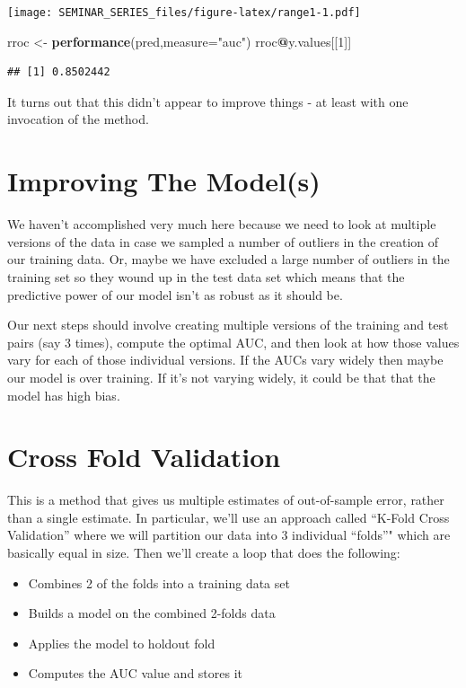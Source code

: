 \documentclass[]{book}
\newenvironment{Shaded}{\begin{snugshade}}{\end{snugshade}}
\newcommand{\KeywordTok}[1]{\textcolor[rgb]{0.13,0.29,0.53}{\textbf{#1}}}
\newcommand{\DataTypeTok}[1]{\textcolor[rgb]{0.13,0.29,0.53}{#1}}
\newcommand{\DecValTok}[1]{\textcolor[rgb]{0.00,0.00,0.81}{#1}}
\newcommand{\StringTok}[1]{\textcolor[rgb]{0.31,0.60,0.02}{#1}}
\newcommand{\OperatorTok}[1]{\textcolor[rgb]{0.81,0.36,0.00}{\textbf{#1}}}
\newcommand{\NormalTok}[1]{#1}
\providecommand{\tightlist}{%
  \setlength{\itemsep}{0pt}\setlength{\parskip}{0pt}}
\begin{document}
\texttt{[image: SEMINAR\_SERIES\_files/figure-latex/range1-1.pdf]}

\begin{Shaded}
\begin{Highlighting}[]
\NormalTok{rroc <-}\StringTok{ }\KeywordTok{performance}\NormalTok{(pred,}\DataTypeTok{measure=}\StringTok{"auc"}\NormalTok{)}
\NormalTok{rroc}\OperatorTok{@}\NormalTok{y.values[[}\DecValTok{1}\NormalTok{]]}
\end{Highlighting}
\end{Shaded}

\begin{verbatim}
## [1] 0.8502442
\end{verbatim}

It turns out that this didn't appear to improve things - at least with
one invocation of the method.

\section{Improving The Model(s)}\label{improving-the-models}

We haven't accomplished very much here because we need to look at
multiple versions of the data in case we sampled a number of outliers in
the creation of our training data. Or, maybe we have excluded a large
number of outliers in the training set so they wound up in the test data
set which means that the predictive power of our model isn't as robust
as it should be.

Our next steps should involve creating multiple versions of the training
and test pairs (say 3 times), compute the optimal AUC, and then look at
how those values vary for each of those individual versions. If the AUCs
vary widely then maybe our model is over training. If it's not varying
widely, it could be that that the model has high bias.

\section{Cross Fold Validation}\label{cross-fold-validation}

This is a method that gives us multiple estimates of out-of-sample
error, rather than a single estimate. In particular, we'll use an
approach called ``K-Fold Cross Validation'' where we will partition our
data into 3 individual ``folds''" which are basically equal in size.
Then we'll create a loop that does the following:

\begin{itemize}
\tightlist
\item
  Combines 2 of the folds into a training data set
\item
  Builds a model on the combined 2-folds data
\item
  Applies the model to holdout fold
\item
  Computes the AUC value and stores it
\end{itemize}
\end{document}
